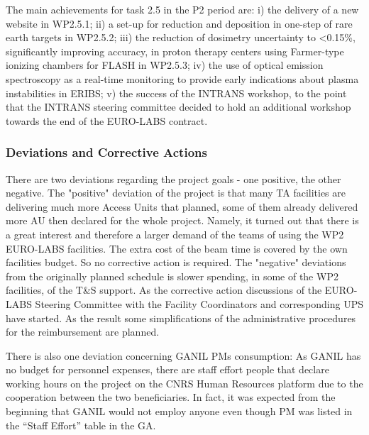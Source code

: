 The main achievements for task 2.5 in the P2 period are: i) the delivery of a new website in WP2.5.1; ii) a set-up for reduction and deposition in one-step of rare earth targets in WP2.5.2; iii) the reduction of dosimetry uncertainty to <0.15\%, significantly improving accuracy, in proton therapy centers using Farmer-type ionizing chambers for FLASH in WP2.5.3; iv) the use of optical emission spectroscopy as a real-time monitoring to provide early indications about plasma instabilities in ERIBS; v) the success of the INTRANS workshop, to the point that the INTRANS steering committee decided to hold an additional workshop towards the end of the EURO-LABS contract.





\subsubsection*{Deviations and Corrective Actions}
\label{sec:wp2-deviations}
There are two deviations regarding the project goals - one positive, the other negative. The "positive" deviation of the project is that many TA facilities are delivering much more Access Units that planned, some of them already delivered more AU then declared for the whole project. Namely, it turned out that there is a great interest and therefore a larger demand of the teams of using the WP2 EURO-LABS facilities. The extra cost of the beam time is covered by the own facilities budget. So no corrective action is required.
The "negative" deviations from the originally planned schedule is slower spending, in some of the WP2 facilities, of the T\&S support. As the corrective action discussions of the EURO-LABS Steering Committee with the Facility Coordinators and corresponding UPS have started. As the result some simplifications of the administrative procedures for the reimbursement are planned.  

There is also one deviation concerning GANIL PMs consumption:
As GANIL has no budget for personnel expenses, there are staff effort people that declare working hours on the project on the CNRS Human Resources platform due to the cooperation between the two beneficiaries.
In fact, it was expected from the beginning that GANIL would not employ anyone even though PM was listed in the “Staff Effort” table in the GA. 


